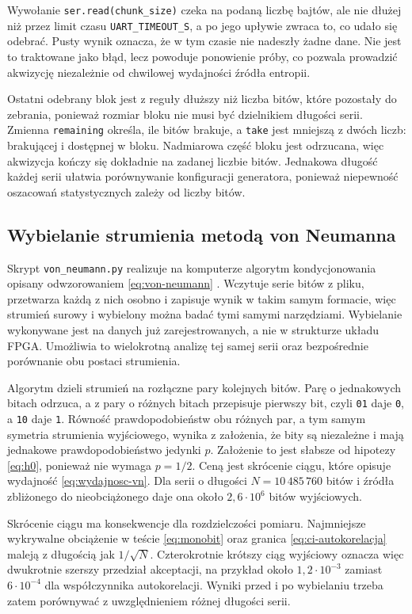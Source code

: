 Wywołanie \texttt{ser.read(chunk\_size)} czeka na podaną liczbę bajtów, ale
nie dłużej niż przez limit czasu \texttt{UART\_TIMEOUT\_S}, a po jego upływie
zwraca to, co udało się odebrać. Pusty wynik oznacza, że w tym czasie nie
nadeszły żadne dane. Nie jest to traktowane jako błąd, lecz powoduje ponowienie
próby, co pozwala prowadzić akwizycję niezależnie od chwilowej wydajności
źródła entropii.

Ostatni odebrany blok jest z reguły dłuższy niż liczba bitów, które pozostały
do zebrania, ponieważ rozmiar bloku nie musi być dzielnikiem długości serii.
Zmienna \texttt{remaining} określa, ile bitów brakuje, a \texttt{take} jest
mniejszą z dwóch liczb: brakującej i dostępnej w bloku. Nadmiarowa część bloku
jest odrzucana, więc akwizycja kończy się dokładnie na zadanej liczbie bitów.
Jednakowa długość każdej serii ułatwia porównywanie konfiguracji generatora,
ponieważ niepewność oszacowań statystycznych zależy od liczby bitów.

\subsection{Wybielanie strumienia metodą von Neumanna}

Skrypt \texttt{von\_neumann.py} realizuje na komputerze algorytm kondycjonowania
opisany odwzorowaniem \eqref{eq:von-neumann} \cite{vonneumann1951}. Wczytuje
serie bitów z pliku, przetwarza każdą z nich osobno i zapisuje wynik w takim
samym formacie, więc strumień surowy i wybielony można badać tymi samymi
narzędziami. Wybielanie wykonywane jest na danych już zarejestrowanych, a nie
w strukturze układu FPGA. Umożliwia to wielokrotną analizę tej samej serii
oraz bezpośrednie porównanie obu postaci strumienia.

Algorytm dzieli strumień na rozłączne pary kolejnych bitów. Parę o jednakowych
bitach odrzuca, a z pary o różnych bitach przepisuje pierwszy bit, czyli
\texttt{01} daje \texttt{0}, a \texttt{10} daje \texttt{1}. Równość
prawdopodobieństw obu różnych par, a tym samym symetria strumienia
wyjściowego, wynika z założenia, że bity są niezależne i mają jednakowe
prawdopodobieństwo jedynki $p$. Założenie to jest słabsze od hipotezy
\eqref{eq:h0}, ponieważ nie wymaga $p = 1/2$. Ceną jest skrócenie ciągu,
które opisuje wydajność \eqref{eq:wydajnosc-vn}. Dla serii o długości
$N = 10\,485\,760$ bitów i źródła zbliżonego do nieobciążonego daje ona około
$2{,}6\cdot 10^{6}$ bitów wyjściowych.

Skrócenie ciągu ma konsekwencje dla rozdzielczości pomiaru. Najmniejsze
wykrywalne obciążenie w teście \eqref{eq:monobit} oraz granica
\eqref{eq:ci-autokorelacja} maleją z długością jak $1/\sqrt{N}$. Czterokrotnie
krótszy ciąg wyjściowy oznacza więc dwukrotnie szerszy przedział akceptacji,
na przykład około $1{,}2\cdot 10^{-3}$ zamiast $6\cdot 10^{-4}$ dla
współczynnika autokorelacji. Wyniki przed i po wybielaniu trzeba zatem
porównywać z uwzględnieniem różnej długości serii.

